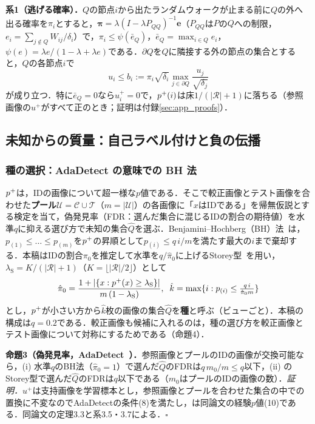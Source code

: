 \textbf{系1（逃げる確率）．}$Q$の節点$i$から出たランダムウォークが止まる前に$Q$の外へ出る確率を$\pi_i$とすると，$\boldsymbol{\pi}=\lambda(I-\lambda P_{QQ})^{-1}\mathbf{e}$（$P_{QQ}$は$P$の$Q$への制限，$e_i=\sum_{j\notin Q}W_{ij}/\delta_i$）で，$\pi_i\le\psi(\bar e_Q)$，$\bar e_Q=\max_{i\in Q}e_i$，$\psi(e)=\lambda e/(1-\lambda+\lambda e)$である．$\partial Q$を$Q$に隣接する外の節点の集合とすると，$Q$の各節点$i$で
\begin{equation}
u_i\le b_i:=\pi_i\sqrt{\delta_i}\max_{j\in\partial Q}\frac{u_j}{\sqrt{\delta_j}}
\label{eq:esc}
\end{equation}
が成り立つ．特に$\bar e_Q=0$なら$u^{+}_i=0$で，$p^{+}(i)$は床$1/(|\mathcal{R}|+1)$に落ちる（参照画像の$u^{+}$がすべて正のとき；証明は付録\ref{sec:app_proofs}）．

\subsection{未知からの質量：自己ラベル付けと負の伝播}
\label{sec:seed}
\subsubsection{種の選択：AdaDetect の意味での BH 法}
$p^{+}$は，IDの画像について超一様な$p$値である．そこで較正画像とテスト画像を合わせた\textbf{プール}$\mathcal{U}=\mathcal{C}\cup\mathcal{T}$（$m=|\mathcal{U}|$）の各画像に「$x$はIDである」を帰無仮説とする検定を当て，偽発見率（FDR：選んだ集合に混じるIDの割合の期待値）を水準$q$に抑える選び方で未知の集合$\hat{Q}$を選ぶ．Benjamini--Hochberg（BH）法~\cite{benjamini1995bh}は，$p_{(1)}\le\dots\le p_{(m)}$を$p^{+}$の昇順として$p_{(i)}\le q\,i/m$を満たす最大の$i$まで棄却する．本稿はIDの割合$\pi_0$を推定して水準を$q/\hat{\pi}_0$に上げるStorey型~\cite{storey2002}を用い，$\lambda_{\mathrm{S}}=K/(|\mathcal{R}|+1)$（$K=\lfloor|\mathcal{R}|/2\rfloor$）として
\begin{equation}
\hat{\pi}_0=\frac{1+|\{x:p^{+}(x)\ge\lambda_{\mathrm{S}}\}|}{m\,(1-\lambda_{\mathrm{S}})},\;\;
\hat{k}=\max\{i:p_{(i)}\le\tfrac{q\,i}{\hat{\pi}_0 m}\}
\label{eq:bh}
\end{equation}
とし，$p^{+}$が小さい方から$\hat{k}$枚の画像の集合$\hat{Q}$を\textbf{種}と呼ぶ（ビューごと）．本稿の構成は$q{=}0.2$である．較正画像も候補に入れるのは，種の選び方を較正画像とテスト画像について対称にするためである（命題4）．

\textbf{命題3（偽発見率，AdaDetect~\cite{marandon2024adadetect}）．}参照画像とプールのIDの画像が交換可能なら，(i) 水準$q$のBH法（$\hat{\pi}_0=1$）で選んだ$\hat{Q}$のFDRは$q\,m_0/m\le q$以下，(ii) のStorey型で選んだ$\hat{Q}$のFDRは$q$以下である（$m_0$はプールのIDの画像の数）．\textit{証明．}$u^{+}$は支持画像を学習標本とし，参照画像とプールを合わせた集合の中での置換に不変なのでAdaDetectの条件(8)を満たし，は同論文の経験$p$値(10)である．同論文の定理3.3と系3.5・3.7による．$\square$

